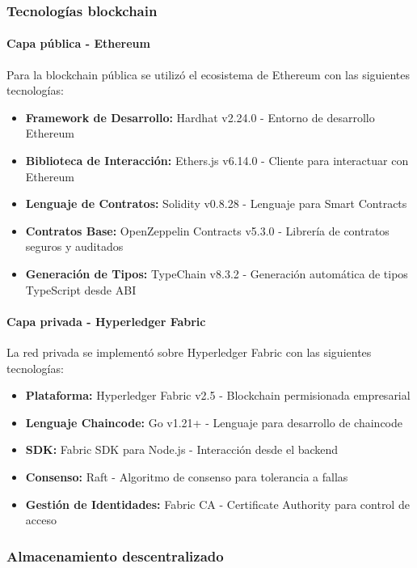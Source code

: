 \subsubsection{Tecnologías blockchain}

\paragraph{Capa pública - Ethereum}
Para la blockchain pública se utilizó el ecosistema de Ethereum con las siguientes tecnologías:

\begin{itemize}
    \item \textbf{Framework de Desarrollo:} Hardhat v2.24.0 - Entorno de desarrollo Ethereum
    \item \textbf{Biblioteca de Interacción:} Ethers.js v6.14.0 - Cliente para interactuar con Ethereum
    \item \textbf{Lenguaje de Contratos:} Solidity v0.8.28 - Lenguaje para Smart Contracts
    \item \textbf{Contratos Base:} OpenZeppelin Contracts v5.3.0 - Librería de contratos seguros y auditados
    \item \textbf{Generación de Tipos:} TypeChain v8.3.2 - Generación automática de tipos TypeScript desde ABI
\end{itemize}

\paragraph{Capa privada - Hyperledger Fabric}
La red privada se implementó sobre Hyperledger Fabric con las siguientes tecnologías:

\begin{itemize}
    \item \textbf{Plataforma:} Hyperledger Fabric v2.5 - Blockchain permisionada empresarial
    \item \textbf{Lenguaje Chaincode:} Go v1.21+ - Lenguaje para desarrollo de chaincode
    \item \textbf{SDK:} Fabric SDK para Node.js - Interacción desde el backend
    \item \textbf{Consenso:} Raft - Algoritmo de consenso para tolerancia a fallas
    \item \textbf{Gestión de Identidades:} Fabric CA - Certificate Authority para control de acceso
\end{itemize}

\subsubsection{Almacenamiento descentralizado}

